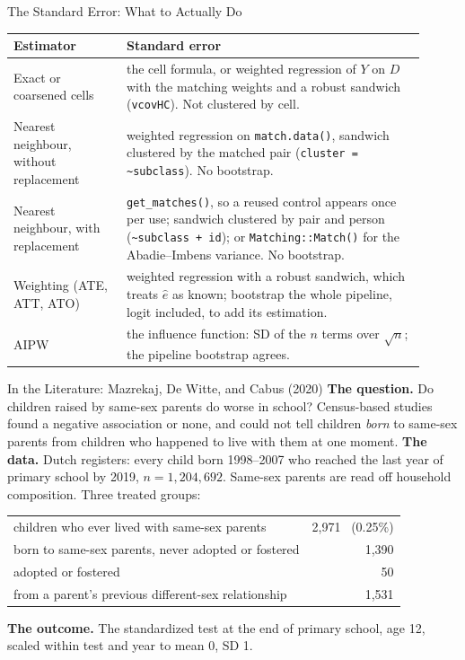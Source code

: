 \documentclass[aspectratio=169,11pt,xcolor=dvipsnames]{beamer}
\begin{document}
\begin{frame}{The Standard Error: What to Actually Do}
\begin{center}\small
\renewcommand{\arraystretch}{1.0}
\begin{tabular}{p{0.25\linewidth}p{0.66\linewidth}}
\toprule
Estimator & Standard error \\
\midrule
Exact or coarsened cells &
  the cell formula, or weighted regression of $Y$ on $D$ with the matching
  weights and a robust sandwich (\texttt{vcovHC}). Not clustered by cell. \\
Nearest neighbour, without replacement &
  weighted regression on \texttt{match.data()}, sandwich clustered by the
  matched pair (\texttt{cluster = \textasciitilde subclass}). No bootstrap. \\
Nearest neighbour, with replacement &
  \texttt{get\_matches()}, so a reused control appears once per use; sandwich
  clustered by pair and person (\texttt{\textasciitilde subclass + id}); or
  \texttt{Matching::Match()} for the Abadie--Imbens variance. No bootstrap. \\
Weighting (ATE, ATT, ATO) &
  weighted regression with a robust sandwich, which treats $\hat e$ as known;
  bootstrap the whole pipeline, logit included, to add its estimation. \\
AIPW &
  the influence function: SD of the $n$ terms over $\sqrt n$; the pipeline
  bootstrap agrees. \\
\bottomrule
\end{tabular}
\end{center}
\end{frame}

\begin{frame}{In the Literature: Mazrekaj, De Witte, and Cabus (2020)}
\textbf{The question.} Do children raised by same-sex parents do worse in
school? Census-based studies found a negative association or none, and could
not tell children \emph{born} to same-sex parents from children who happened
to live with them at one moment.
\vskip2pt
\textbf{The data.} Dutch registers: every child born 1998--2007 who reached the
last year of primary school by 2019, $n = 1{,}204{,}692$. Same-sex parents are
read off household composition. Three treated groups:
\begin{center}\footnotesize
\renewcommand{\arraystretch}{1.05}
\begin{tabular}{lr}
\toprule
children who ever lived with same-sex parents & 2,971 \ (0.25\%) \\
\quad born to same-sex parents, never adopted or fostered & 1,390 \\
\quad adopted or fostered & 50 \\
\quad from a parent's previous different-sex relationship & 1,531 \\
\bottomrule
\end{tabular}
\end{center}
\textbf{The outcome.} The standardized test at the end of primary school, age
12, scaled within test and year to mean 0, SD 1.
\end{frame}
\end{document}
